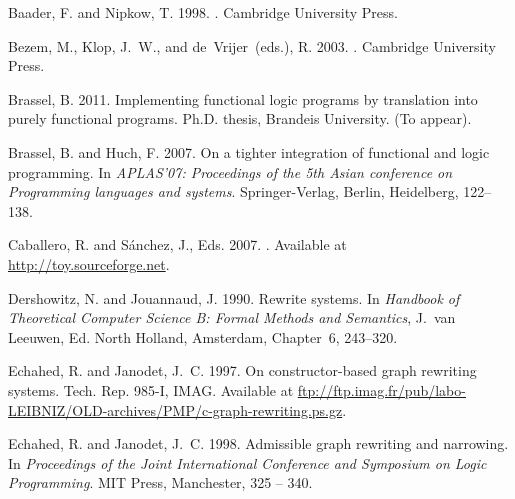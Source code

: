 \documentclass{mytlp}
\begin{document}
\begin{thebibliography}{}
{\sc Baader, F.} {\sc and} {\sc Nipkow, T.} 1998.
.
\newblock Cambridge University Press.

{\sc Bezem, M.}, {\sc Klop, J.~W.}, {\sc and} {\sc de~Vrijer~(eds.), R.} 2003.
.
\newblock Cambridge University Press.

{\sc Brassel, B.} 2011.
\newblock Implementing functional logic programs by translation into purely
  functional programs.
\newblock Ph.D. thesis, Brandeis University.
\newblock (To appear).

{\sc Brassel, B.} {\sc and} {\sc Huch, F.} 2007.
\newblock On a tighter integration of functional and logic programming.
\newblock In {\em APLAS'07: Proceedings of the 5th Asian conference on
  Programming languages and systems}. Springer-Verlag, Berlin, Heidelberg,
  122--138.

{\sc Caballero, R.} {\sc and} {\sc S\'{a}nchez, J.}, Eds. 2007.
.
\newblock Available at \url{http://toy.sourceforge.net}.

{\sc Dershowitz, N.} {\sc and} {\sc Jouannaud, J.} 1990.
\newblock Rewrite systems.
\newblock In {\em Handbook of Theoretical Computer Science B: Formal Methods
  and Semantics}, {J.~{van Leeuwen}}, Ed. North Holland, Amsterdam, Chapter~6,
  243--320.

{\sc Echahed, R.} {\sc and} {\sc Janodet, J.~C.} 1997.
\newblock On constructor-based graph rewriting systems.
\newblock Tech. Rep. 985-I, IMAG.
\newblock Available at
  \url{ftp://ftp.imag.fr/pub/labo-LEIBNIZ/OLD-archives/PMP/c-graph-rewriting.ps.gz}.

{\sc Echahed, R.} {\sc and} {\sc Janodet, J.~C.} 1998.
\newblock Admissible graph rewriting and narrowing.
\newblock In {\em Proceedings of the Joint International Conference and
  Symposium on Logic Programming}. MIT Press, Manchester, 325 -- 340.


\end{thebibliography}
\end{document}
